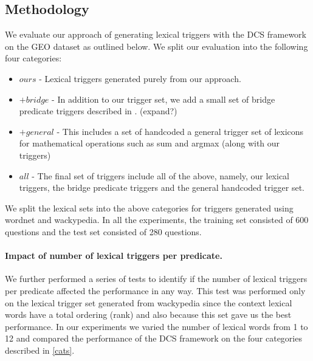\documentclass[11pt]{article}
\begin{document}
\subsection{Methodology}
We evaluate our approach of generating lexical triggers with the DCS framework on the {\sc GEO} dataset as outlined below. We split our evaluation into the following four categories:
\begin{itemize} \label{cats}
 \item $ours$ - Lexical triggers generated purely from our approach. 
 \item $+bridge$ - In addition to our trigger set, we add a small set of bridge predicate triggers described in \cite{LJK11}. (expand?) 
 \item $+general$ - This includes a set of handcoded a general trigger set of lexicons for mathematical operations such as sum and argmax (along with our triggers)
 \item $all$ - The final set of triggers include all of the above, namely, our lexical triggers, the bridge predicate triggers and the general handcoded trigger set.
\end{itemize}
We split the lexical sets into the above categories for triggers generated using wordnet and wackypedia. In all the experiments, the training set consisted of 600 questions and the test set consisted of 280 questions.

\paragraph{Impact of number of lexical triggers per predicate.} We further performed a series of tests to identify if the number of lexical triggers per predicate affected the performance in any way. This test was performed only on the lexical trigger set generated from wackypedia since the context lexical words have a total ordering (rank) and also because this set gave us the best performance. In our experiments we varied the number of lexical words from 1 to 12 and compared the performance of the DCS framework on the four categories described in \ref{cats}.
\end{document}
